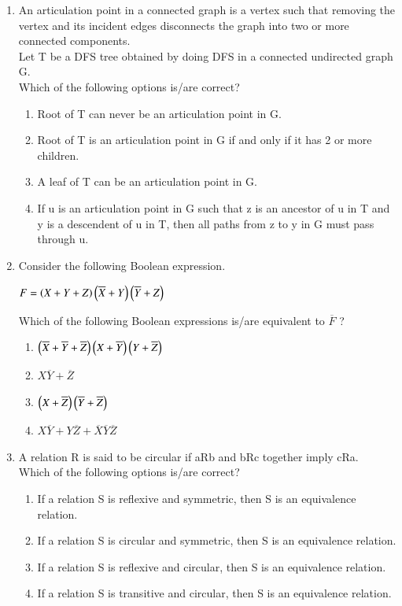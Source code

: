 \documentclass[a4paper, 11pt]{article}
\begin{document}
\begin{enumerate}
    \item An articulation point in a connected graph is a vertex such that removing the vertex and its incident edges disconnects the graph into two or more connected components.\\Let T be a DFS tree obtained by doing DFS in a connected undirected graph G.\\Which of the following options is/are correct?
    \begin{enumerate}
        \item Root of T can never be an articulation point in G.
        \item Root of T is an articulation point in G if and only if it has 2 or more children.
        \item A leaf of T can be an articulation point in G.
        \item If u is an articulation point in G such that z is an ancestor of u in T and y is a descendent of u in T, then all paths from z to y in G must pass through u.
    \end{enumerate}
    \hfill{}
    \item Consider the following Boolean expression.
    \begin{center}
    $F = \left(X+Y+Z\right)\left(\overline{X}+Y\right)\left(\overline{Y}+Z\right)$
    \end{center}
    Which of the following Boolean expressions is/are equivalent to $\overline{F}$ ?
    \begin{enumerate}
        \item $\left(\overline{X}+\overline{Y}+\overline{Z}\right)\left(X+\overline{Y}\right)\left(Y+\overline{Z}\right)$
        \item $X\overline{Y}+\overline{Z}$
        \item $\left(X+\overline{Z}\right)\left(\overline{Y}+\overline{Z}\right)$
        \item $X\overline{Y}+Y\overline{Z}+\overline{X}\overline{Y}\overline{Z}$
    \end{enumerate}
    \hfill{}
    \item A relation R is said to be circular if aRb and bRc together imply cRa.\\
    Which of the following options is/are correct?
    
    \begin{enumerate}
        \item If a relation S is reflexive and symmetric, then S is an equivalence relation.
        \item If a relation S is circular and symmetric, then S is an equivalence relation.
        \item If a relation S is reflexive and circular, then S is an equivalence relation.
        \item If a relation S is transitive and circular, then S is an equivalence relation.
    \end{enumerate}
    \hfill{}
    

\end{enumerate}
\end{document}
